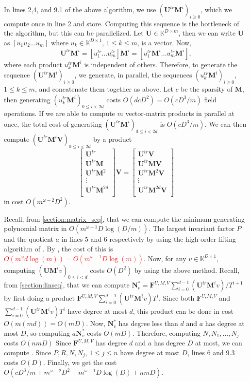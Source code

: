 \documentclass[12pt]{article}
\newcommand{\todo}[1]{\textcolor{red}{#1}}
\def\mF{\mathbf{F}}
\def\mM{\mathbf{M}}
\def\mN{\mathbf{N}}
\def\mU{\mathbf{U}}
\def\mV{\mathbf{V}}
\begin{document}
In lines 2,4, and 9.1 of the above algorithm, we use $(\mU^{tr}\mM^i)_{i\ge 0}$, which we compute once
in line 2 and store. Computing this sequence is the bottleneck of the algorithm, but this can be
parallelized. Let $\mU \in \mathbb{K}^{D \times m}$, then we can write $\mU$ as $[u_1 u_2 \dots u_m]$ where
$u_k \in \mathbb{K}^{D \times 1}$, $1 \le k \le m$, is a vector. Now,
$$ \mU^{tr} \mM^i = [u_1^{tr} \dots u_m^{tr}] \mM^i = [u_1^{tr} \mM^i \dots u_m^{tr} \mM^i],$$
where each product $u_k^{tr} \mM^i$ is independent of others. Therefore, to generate the
sequence $(\mU^{tr}\mM^i)_{i\ge0}$, we generate, in parallel, 
the sequences $(u_k^{tr} \mM^i)_{i\ge0}$, $1 \le k \le m$, and concatenate them together as above.
Let $c$ be the sparsity of $\mM$, then generating $(u_k^{tr} \mM^i)_{0 \le i < 2d}$ costs 
$O(d cD^2) = O(cD^3/m )$ field operations. If we are able to compute $m$ 
vector-matrix products in parallel at once, the total cost of generating $(\mU^{tr}\mM^i)_{0 \le i < 2d}$
is $O(cD^3/m)$. We can then compute $(\mU^{tr}\mM^i\mV)_{0 \le i < 2d}$ by a product
$$
\begin{bmatrix}
\mU^{tr}\\
\mU^{tr} \mM\\
\mU^{tr} \mM^2\\
\vdots\\
\mU^{tr} \mM^{2d}\\
\end{bmatrix} \mV
= 
\begin{bmatrix}
\mU^{tr} \mV\\
\mU^{tr} \mM \mV\\
\mU^{tr} \mM^2 \mV\\
\vdots \\
\mU^{tr} \mM^{2d} \mV\\
\end{bmatrix}
$$
in cost $O(m^{\omega-2}D^2)$.

Recall, from \cref{section:matrix_seq}, that we can compute
the minimum generating polynomial matrix in $O(m^{\omega-1} D \log(D/m))$.
The largest invariant factor $P$ and the quotient $a$ in lines 5 and 6 respectively by using the high-order
lifting algorithm of \cite[Algorithm~5]{Stor03}. 
By \cite[Corollary~16]{Stor03}, the cost of this is 
\todo{$O(m^{\omega} d \log(m)) = O(m^{\omega-1} D \log(m))$}.
Now, for any $v\in\mathbb{K}^{D \times 1}$, computing $(\mU \mM^i v)_{0\le i < d}$ costs
$O(D^2)$ by using the above method. Recall, from \cref{section:linseq}, that
we can compute $\mN_v^* = \mF^{U,M,V}\sum_{i=0}^{d-1} {(\mU^{tr}\mM^iv)}/{T^{i+1}}$ by first
doing a product $\mF^{U,M,V}\sum_{i=0}^{d-1} {(\mU^{tr}\mM^iv)}T^i$.
Since both $\mF^{U,M,V}$ and $\sum_{i=0}^{d-1} {(\mU^{tr}\mM^iv)}T^i$
have degree at most $d$, this product can be done in cost $O(m(md)) = O(mD)$.
Now, $\mN_v^*$ has degree less than $d$ and $a$ has degree at most $D$, so
computing $a \mN_v^*$ costs $O(mD)$. Therefore, computing $N,N_1,\dots,N_j$ costs $O(nmD)$
Since $\mF^{U,M,V}$ has degree $d$ and $a$ has degree $D$ at most, we
can compute . Since $P,R,N,N_j$, $1\le j \le n$
have degree at most $D$, lines 6 and 9.3 costs $O(D)$.
Finally, we get the cost $O(cD^3/m + m^{\omega-2}D^2 + m^{\omega-1} D \log(D) + nmD )$.
\end{document}

